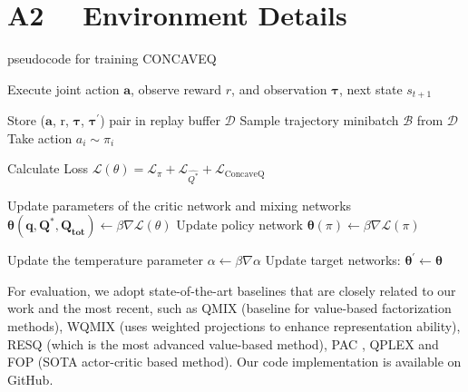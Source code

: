 \section{A2 \ \ Environment Details}

\begin{algorithm}
    \caption{pseudocode for training CONCAVEQ  }
    \begin{algorithmic}
              \STATE Execute joint action $\mathbf{a}$, observe reward $r$, and observation $\boldsymbol{\tau}$, next state $s_{t+1}$
              
              \STATE Store ($\boldsymbol{a}$, r, $\boldsymbol{\tau}$, $\boldsymbol{\tau^{'}}$) pair in replay buffer  $\mathcal{D}$
            \ENDFOR
            \STATE Sample trajectory minibatch $\mathcal{B}$ from $\mathcal{D}$
            \STATE Take action $a_{i}\sim \pi_{i}$
            
            \STATE Calculate Loss 
            \STATE \quad\quad\quad $\mathcal{L}(\theta) = \mathcal{L}_{\pi} +  \mathcal{L}_{\hat{Q^{*}}} + \mathcal{L}_{{\text{ConcaveQ}}}$
            
            \STATE Update parameters of the critic network and mixing networks
            \STATE \quad\quad\quad $\boldsymbol{\theta(q, Q^*, Q_{tot})} \gets \beta\nabla\mathcal{L}(\theta)$ 
            \STATE Update policy network 
            \STATE \quad\quad\quad $\boldsymbol{\theta}(\pi) \gets \beta\nabla\mathcal{L}(\pi)$

            \STATE  Update the temperature parameter
            \STATE \quad\quad\quad  $\alpha \gets \beta \nabla\alpha$ 
                \STATE Update target networks: $\boldsymbol{\theta^{\prime}} \gets \boldsymbol{\theta} $
            \ENDIF
        \ENDFOR
        \ENDFOR
    \end{algorithmic}
\end{algorithm}
For evaluation, we adopt state-of-the-art baselines that are closely related to our work and the most recent, such as   QMIX (baseline for value-based factorization methods), WQMIX (uses weighted projections to enhance representation ability), RESQ \cite{ResQ} (which is the most advanced value-based method), PAC \cite{pac}, QPLEX \cite{QPLEX} and  FOP \cite{fop} (SOTA actor-critic based method).   Our code implementation is available on GitHub.


